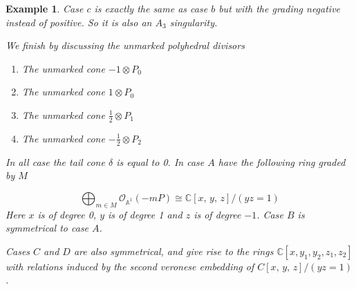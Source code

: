 \documentclass[12pt,a4paper]{book}      %
\newtheorem{ex}[thm]{Example}
\begin{document}
\begin{ex}
Case $c$ is exactly the same as case $b$ but with the grading negative instead of positive. So it is also an $A_3$ singularity.


We finish by discussing the unmarked polyhedral divisors

\begin{enumerate}[label =\Alph*)]
\item The unmarked cone $-1 \otimes P_0$
\item The unmarked cone $1 \otimes P_0$
\item The unmarked cone $\frac{1}{2} \otimes P_1$
\item The unmarked cone $-\frac{1}{2} \otimes P_2$
\end{enumerate}

In all case the tail cone $\delta$ is equal to 0. In case $A$ have the following ring graded by $M$

\[
\bigoplus_{m \in M} \mathcal{O}_{\mathbb{A}^1}(-mP) \cong \mathbb{C}[x,\, y, \, z]/(yz = 1)
\]
Here $x$ is of degree 0, $y$ is of degree 1 and $z$ is of degree $-1$. Case $B$ is symmetrical to case $A$. 

Cases $C$ and $D$ are also symmetrical, and give rise to the rings $\mathbb{C}[x, y_1, y_2, z_1, z_2]$ with relations induced by the second veronese embedding of $C[x, \, y, \, z]/(yz = 1)$. 


\end{ex}
\end{document}
